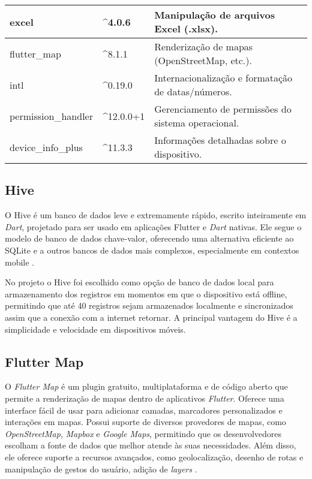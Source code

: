 \begin{table}[H]
\begin{tabular}{|p{4cm}|p{2.5cm}|p{8cm}|}
    excel & \^{}4.0.6 & Manipulação de arquivos Excel (.xlsx). \\ \hline
    flutter\_map & \^{}8.1.1 & Renderização de mapas (OpenStreetMap, etc.). \\ \hline
    intl & \^{}0.19.0 & Internacionalização e formatação de datas/números. \\ \hline
    permission\_handler & \^{}12.0.0+1 & Gerenciamento de permissões do sistema operacional. \\ \hline
    device\_info\_plus & \^{}11.3.3 & Informações detalhadas sobre o dispositivo. \\ \hline
    \end{tabular}
    \label{tab:dependencias_flutter}
\end{table}
    
\subsection{Hive}

O Hive é um banco de dados leve e extremamente rápido, escrito inteiramente 
em \textit{Dart}, projetado para ser usado em aplicações Flutter e 
\textit{Dart} nativas. Ele segue o modelo de banco de dados chave-valor, 
oferecendo uma alternativa eficiente ao SQLite e a outros bancos de dados 
mais complexos, especialmente em contextos mobile \cite{hive2025}.

No projeto o Hive foi escolhido como opção de banco de dados local para armazenamento dos registros em momentos em que o dispositivo está offline, 
permitindo que até 40 registros sejam armazenados localmente e sincronizados assim que a conexão com a internet retornar.
A principal vantagem do Hive é a simplicidade e velocidade em dispositivos móveis.

\subsection{Flutter Map}
O \textit{Flutter Map} é um plugin gratuito, multiplataforma e de código aberto
que permite a renderização de mapas 
dentro de aplicativos \textit{Flutter}. Oferece uma interface fácil de usar 
para adicionar camadas, marcadores personalizados e interações em mapas.
Possui suporte de diversos provedores de mapas, como
\textit{OpenStreetMap}, \textit{Mapbox} e \textit{Google Maps}, 
permitindo que os desenvolvedores 
 escolham a fonte de dados que melhor atende às suas necessidades. 
 Além disso, ele oferece suporte a recursos avançados, como 
 geolocalização, desenho de rotas e manipulação de gestos do 
 usuário, adição de \textit{layers} \cite{flutter_map_doc}.
 
